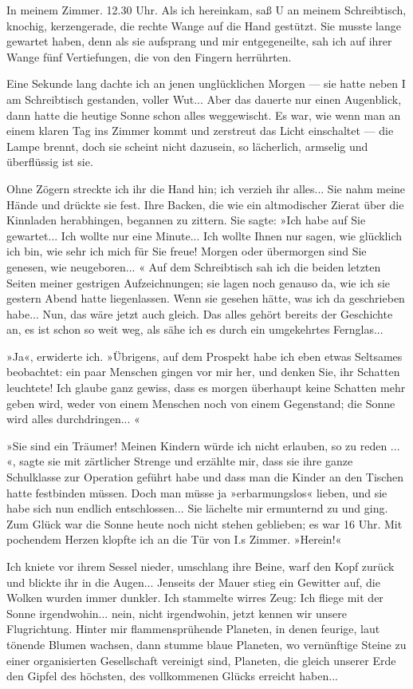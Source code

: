 In meinem Zimmer. 12.30 Uhr. Als ich hereinkam, saß U an meinem
Schreibtisch, knochig, kerzengerade, die rechte Wange auf die Hand
gestützt. Sie musste lange gewartet haben, denn als sie aufsprang
und mir entgegeneilte, sah ich auf ihrer Wange fünf Vertiefungen,
die von den Fingern herrührten.

Eine Sekunde lang dachte ich an jenen unglücklichen Morgen — sie
hatte neben I am Schreibtisch gestanden, voller Wut... Aber das
dauerte nur einen Augenblick, dann hatte die heutige Sonne schon
alles weggewischt. Es war, wie wenn man an einem klaren Tag ins
Zimmer kommt und zerstreut das Licht einschaltet — die Lampe
brennt, doch sie scheint nicht dazusein, so lächerlich, armselig
und überflüssig ist sie.

Ohne Zögern streckte ich ihr die Hand hin; ich verzieh ihr alles...
Sie nahm meine Hände und drückte sie fest. Ihre Backen, die wie ein
altmodischer Zierat über die Kinnladen herabhingen, begannen zu
zittern. Sie sagte: »Ich habe auf Sie gewartet... Ich wollte nur
eine Minute... Ich wollte Ihnen nur sagen, wie glücklich ich bin,
wie sehr ich mich für Sie freue! Morgen oder übermorgen sind Sie
genesen, wie neugeboren... « Auf dem Schreibtisch sah ich die
beiden letzten Seiten meiner gestrigen Aufzeichnungen; sie lagen
noch genauso da, wie ich sie gestern Abend hatte liegenlassen. Wenn
sie gesehen hätte, was ich da geschrieben habe... Nun, das wäre
jetzt auch gleich. Das alles gehört bereits der Geschichte an, es
ist schon so weit weg, als sähe ich es durch ein umgekehrtes
Fernglas...

»Ja«, erwiderte ich. »Übrigens, auf dem Prospekt habe ich eben
etwas Seltsames beobachtet: ein paar Menschen gingen vor mir her,
und denken Sie, ihr Schatten leuchtete! Ich glaube ganz gewiss,
dass es morgen überhaupt keine Schatten mehr geben wird, weder von
einem Menschen noch von einem Gegenstand; die Sonne wird alles
durchdringen... «

»Sie sind ein Träumer! Meinen Kindern würde ich nicht erlauben, so
zu reden ... «, sagte sie mit zärtlicher Strenge und erzählte mir,
dass sie ihre ganze Schulklasse zur Operation geführt habe und dass
man die Kinder an den Tischen hatte festbinden müssen. Doch man
müsse ja »erbarmungslos« lieben, und sie habe sich nun endlich
entschlossen... Sie lächelte mir ermunternd zu und ging. Zum Glück
war die Sonne heute noch nicht stehen geblieben; es war 16 Uhr. Mit
pochendem Herzen klopfte ich an die Tür von I.s Zimmer. »Herein!«

Ich kniete vor ihrem Sessel nieder, umschlang ihre Beine, warf den
Kopf zurück und blickte ihr in die Augen... Jenseits der Mauer
stieg ein Gewitter auf, die Wolken wurden immer dunkler. Ich
stammelte wirres Zeug: Ich fliege mit der Sonne irgendwohin...
nein, nicht irgendwohin, jetzt kennen wir unsere Flugrichtung.
Hinter mir flammensprühende Planeten, in denen feurige, laut
tönende Blumen wachsen, dann stumme blaue Planeten, wo vernünftige
Steine zu einer organisierten Gesellschaft vereinigt sind,
Planeten, die gleich unserer Erde den Gipfel des höchsten, des
vollkommenen Glücks erreicht haben...

